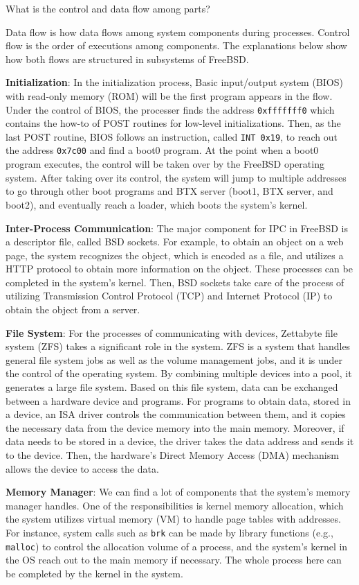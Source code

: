 \documentclass[12pt, dvipsnames, a4paper]{article}
\newcommand{\code}[1]{\texttt{#1}}
\begin{document}
What is the control and data flow among parts?\par
Data flow is how data flows among system components during processes. Control flow is the order of executions among components. The explanations below show how both flows are structured in subsystems of FreeBSD.\par
\textbf{Initialization}: In the initialization process, Basic input/output system (BIOS) with read-only memory (ROM) will be the first program appears in the flow. Under the control of BIOS, the processer finds the address \code{0xfffffff0} which contains the how-to of POST routines for low-level initializations. Then, as the last POST routine, BIOS follows an instruction, called \code{INT 0x19}, to reach out the address \code{0x7c00} and find a boot0 program. At the point when a boot0 program executes, the control will be taken over by the FreeBSD operating system. After taking over its control, the system will jump to multiple addresses to go through other boot programs and BTX server (boot1, BTX server, and boot2), and eventually reach a loader, which boots the system’s kernel.\par
\textbf{Inter-Process Communication}: The major component for IPC in FreeBSD is a descriptor file, called BSD sockets. For example, to obtain an object on a web page, the system recognizes the object, which is encoded as a file, and utilizes a HTTP protocol to obtain more information on the object. These processes can be completed in the system’s kernel. Then, BSD sockets take care of the process of utilizing Transmission Control Protocol (TCP) and Internet Protocol (IP) to obtain the object from a server.\par
\textbf{File System}: For the processes of communicating with devices, Zettabyte file system (ZFS) takes a significant role in the system. ZFS is a system that handles general file system jobs as well as the volume management jobs, and it is under the control of the operating system. By combining multiple devices into a pool, it generates a large file system. Based on this file system, data can be exchanged between a hardware device and programs. For programs to obtain data, stored in a device, an ISA driver controls the communication between them, and it copies the necessary data from the device memory into the main memory. Moreover, if data needs to be stored in a device, the driver takes the data address and sends it to the device. Then, the hardware’s Direct Memory Access (DMA) mechanism allows the device to access the data.\par
\textbf{Memory Manager}: We can find a lot of components that the system’s memory manager handles. One of the responsibilities is kernel memory allocation, which the system utilizes virtual memory (VM) to handle page tables with addresses. For instance, system calls such as \code{brk} can be made by library functions (e.g., \code{malloc}) to control the allocation volume of a process, and the system’s kernel in the OS reach out to the main memory if necessary. The whole process here can be completed by the kernel in the system.\par
\end{document}
